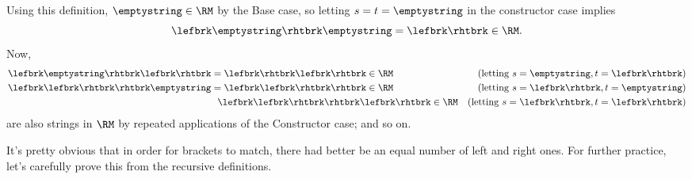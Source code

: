 Using this definition, $\emptystring \in\RM$ by the Base
case, so letting $s=t =\emptystring$ in the constructor case implies
\[
\lefbrk\emptystring\rhtbrk\emptystring=\lefbrk\rhtbrk\in\RM.
\]
Now,
\begin{align*}
\lefbrk\emptystring\rhtbrk\lefbrk\rhtbrk &= \lefbrk\rhtbrk\lefbrk\rhtbrk \in \RM
    & \text{(letting $s = \emptystring, t = \lefbrk\rhtbrk$)}\\
\lefbrk\lefbrk\rhtbrk\rhtbrk\emptystring & = \lefbrk\lefbrk\rhtbrk\rhtbrk \in \RM
    & \text{(letting $s = \lefbrk\rhtbrk, t = \emptystring$)}\\
&\ \ \lefbrk\lefbrk\rhtbrk\rhtbrk\lefbrk\rhtbrk \in \RM
    & \text{(letting $s = \lefbrk\rhtbrk, t = \lefbrk\rhtbrk$)}
\end{align*}
are also strings in $\RM$ by repeated applications of the Constructor
case; and so on.

\iffalse
If you haven't seen this kind of definition before, you should
try continuing this example to verify that
$\lefbrk\lefbrk\lefbrk\rhtbrk\rhtbrk\lefbrk\rhtbrk\rhtbrk\lefbrk\rhtbrk
\in \RM$.
\fi


\iffalse
Given the way this section is set up you might guess that $\RM = \GC$,
and you'd be right, but it's not completely obvious.  The proof is worked
out in Problem~\ref{PS_bracket_good_count}.
\fi

It's pretty obvious that in order for brackets to match, there had
better be an equal number of left and right ones.  For further
practice, let's carefully prove this from the recursive definitions.


